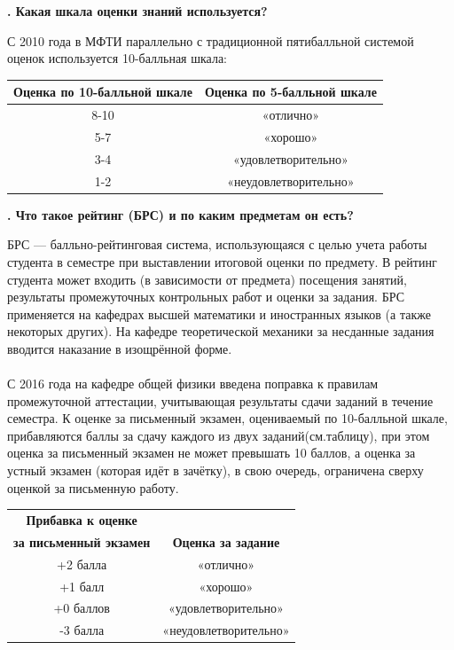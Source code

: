 \documentclass[14pt]{extarticle}
\newcounter{question}
\newcommand\Que[1]{%
    \begin{minipage}{\textwidth}
    \leavevmode\par
    \stepcounter{question}
    \noindent
    {\large\textbf{\thequestion. #1}}\par}
\newcommand\Partans[2][]{%
    \leavevmode\par\noindent
    {\leftskip37pt
    \textbf{#1}#2\par}}
\begin{document}
\Que{Какая шкала оценки знаний используется?}
\Partans{С 2010 года в МФТИ параллельно с традиционной пятибалльной системой оценок используется 10-балльная шкала:}
\begin{center}
\begin{tabular}{ |c|c| }
\hline
    \textbf{Оценка по 10-балльной шкале} & \textbf{Оценка по 5-балльной шкале} \\ \hline
    8-10 & «отлично» \\ \hline
    5-7 & «хорошо» \\ \hline
    3-4 & «удовлетворительно» \\ \hline
    1-2 & «неудовлетворительно» \\
\hline
\end{tabular}
\end{center}
\end{minipage}

\Que{Что такое рейтинг (БРС) и по каким предметам он есть?}
\Partans{БРС — балльно-рейтинговая система, использующаяся с целью учета работы студента в семестре при выставлении итоговой оценки по предмету. В рейтинг студента может входить (в зависимости от предмета) посещения занятий, результаты промежуточных контрольных работ и оценки за задания. БРС применяется на кафедрах высшей математики и иностранных языков (а также некоторых других). На кафедре теоретической механики за несданные задания вводится наказание в изощрённой форме. \\ \\ С 2016 года на кафедре общей физики введена поправка к правилам промежуточной аттестации, учитывающая результаты сдачи заданий в течение семестра. К оценке за письменный экзамен, оцениваемый по 10-балльной шкале, прибавляются баллы за сдачу каждого из двух заданий(см.таблицу), при этом оценка за письменный экзамен не может превышать 10 баллов, а оценка за устный экзамен (которая идёт в зачётку), в свою очередь, ограничена сверху оценкой за письменную работу.}

\begin{center}
\begin{tabular}{ |c|c| }
\hline
    \textbf{Прибавка к оценке} & \\
    \textbf{за письменный экзамен} & \textbf{Оценка за задание} \\ \hline
    +2 балла & «отлично» \\ \hline
    +1 балл & «хорошо» \\ \hline
    +0 баллов & «удовлетворительно» \\ \hline
    -3 балла & «неудовлетворительно» \\
\hline
\end{tabular}
\end{center}
\end{minipage}
\end{document}
